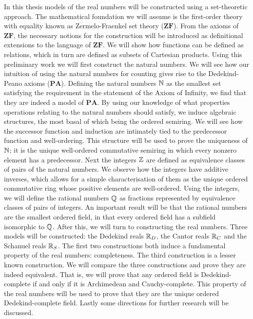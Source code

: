 \documentclass[../main.tex]{subfiles}
\begin{document}
In this thesis models of the real numbers will be constructed using a set-theoretic approach. The mathematical foundation we will assume is the first-order theory with equality known as Zermelo-Fraenkel set theory ($\mathbf{ZF}$). From the axioms of $\mathbf{ZF}$, the necessary notions for the construction will be introduced as definitional extensions to the language of $\mathbf{ZF}$. We will show how functions can be defined as relations, which in turn are defined as subsets of Cartesian products. Using this preliminary work we will first construct the natural numbers. We will see how our intuition of using the natural numbers for counting gives rise to the Dedekind-Peano axioms ($\mathbf{PA}$). Defining the natural numbers $\mathbb{N}$ as the smallest set satisfying the requirement in the statement of the Axiom of Infinity, we find that they are indeed a model of $\mathbf{PA}$. By using our knowledge of what properties operations relating to the natural numbers should satisfy, we induce algebraic structures, the most basal of which being the ordered semiring. We will see how the successor function and induction are intimately tied to the predecessor function and well-ordering. This structure will be used to prove the uniqueness of $\mathbb{N}$; it is the unique well-ordered commutative semiring in which every nonzero element has a predecessor. Next the integers $\mathbb{Z}$ are defined as equivalence classes of pairs of the natural numbers. We observe how the integers have additive inverses, which allows for a simple characterisation of them as the unique ordered commutative ring whose positive elements are well-ordered. Using the integers, we will define the rational numbers $\mathbb{Q}$ as fractions represented by equivalence classes of pairs of integers. An important result will be that the rational numbers are the smallest ordered field, in that every ordered field has a subfield isomorphic to $\mathbb{Q}$. After this, we will turn to constructing the real numbers. Three models will be constructed: the Dedekind reals $\mathbb{R}_D$, the Cantor reals $\mathbb{R}_C$ and the Schanuel reals $\mathbb{R}_S$. The first two constructions both induce a fundamental property of the real numbers: completeness. The third construction is a lesser known construction. We will compare the three constructions and prove they are indeed equivalent. That is, we will prove that any ordered field is Dedekind-complete if and only if it is Archimedean and Cauchy-complete. This property of the real numbers will be used to prove that they are the unique ordered Dedekind-complete field. Lastly some directions for further research will be discussed.
\end{document}
